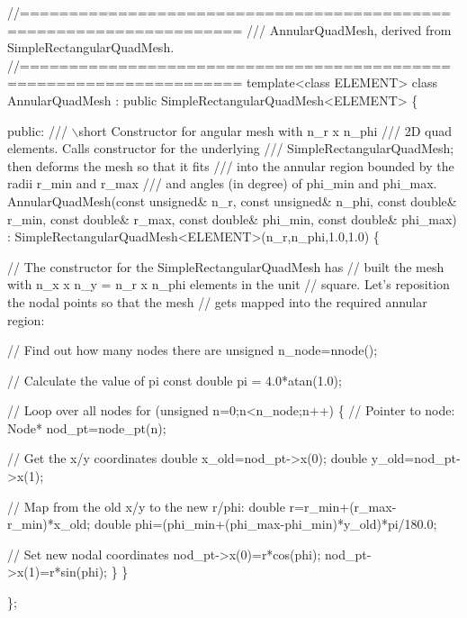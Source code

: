 \begin{DoxyCode}
\textcolor{comment}{//====================================================================}\textcolor{comment}{}
\textcolor{comment}{/// AnnularQuadMesh, derived from SimpleRectangularQuadMesh.}
\textcolor{comment}{}\textcolor{comment}{//====================================================================}
\textcolor{keyword}{template}<\textcolor{keyword}{class} ELEMENT> 
\textcolor{keyword}{class }AnnularQuadMesh : \textcolor{keyword}{public} SimpleRectangularQuadMesh<ELEMENT>
\{
 
  \textcolor{keyword}{public}:
\textcolor{comment}{}
\textcolor{comment}{ /// \(\backslash\)short Constructor for angular mesh with n\_r x n\_phi }
\textcolor{comment}{ /// 2D quad elements. Calls constructor for the underlying }
\textcolor{comment}{ /// SimpleRectangularQuadMesh; then deforms the mesh so that it fits }
\textcolor{comment}{ /// into the annular region bounded by the radii r\_min and r\_max}
\textcolor{comment}{ /// and angles (in degree) of phi\_min and phi\_max.}
\textcolor{comment}{} AnnularQuadMesh(\textcolor{keyword}{const} \textcolor{keywordtype}{unsigned}& n\_r, \textcolor{keyword}{const} \textcolor{keywordtype}{unsigned}& n\_phi,
                 \textcolor{keyword}{const} \textcolor{keywordtype}{double}& r\_min, \textcolor{keyword}{const} \textcolor{keywordtype}{double}& r\_max,
                 \textcolor{keyword}{const} \textcolor{keywordtype}{double}& phi\_min, \textcolor{keyword}{const} \textcolor{keywordtype}{double}& phi\_max) :
  SimpleRectangularQuadMesh<ELEMENT>(n\_r,n\_phi,1.0,1.0)
  \{

   \textcolor{comment}{// The constructor for the  SimpleRectangularQuadMesh has}
   \textcolor{comment}{// built the mesh with n\_x x n\_y = n\_r x n\_phi elements in the unit}
   \textcolor{comment}{// square. Let's reposition the nodal points so that the mesh}
   \textcolor{comment}{// gets mapped into the required annular region:}

   \textcolor{comment}{// Find out how many nodes there are}
   \textcolor{keywordtype}{unsigned} n\_node=nnode();

   \textcolor{comment}{// Calculate the value of pi}
   \textcolor{keyword}{const} \textcolor{keywordtype}{double} pi = 4.0*atan(1.0);

   \textcolor{comment}{// Loop over all nodes}
   \textcolor{keywordflow}{for} (\textcolor{keywordtype}{unsigned} n=0;n<n\_node;n++)
    \{
     \textcolor{comment}{// Pointer to node:}
     Node* nod\_pt=node\_pt(n);

     \textcolor{comment}{// Get the x/y coordinates}
     \textcolor{keywordtype}{double} x\_old=nod\_pt->x(0);
     \textcolor{keywordtype}{double} y\_old=nod\_pt->x(1);

     \textcolor{comment}{// Map from the old x/y to the new r/phi:}
     \textcolor{keywordtype}{double} r=r\_min+(r\_max-r\_min)*x\_old;
     \textcolor{keywordtype}{double} phi=(phi\_min+(phi\_max-phi\_min)*y\_old)*pi/180.0;

     \textcolor{comment}{// Set new nodal coordinates}
     nod\_pt->x(0)=r*cos(phi);
     nod\_pt->x(1)=r*sin(phi);
    \}
  \}

\};
\end{DoxyCode}
